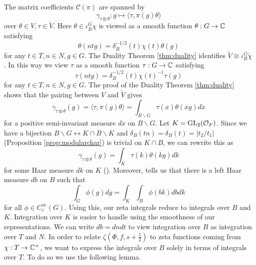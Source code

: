 The matrix coefficients $\mathcal C(\pi)$ are spanned by 
$$\gamma_{\tau \otimes \theta} : g \mapsto \langle \tau, \pi(g) \theta \rangle$$ over $\theta \in V, \tau \in \check{V}$. Here $\theta \in \iota_B^G \chi$ is viewed as a smooth function $\theta : G \to \mathbb{C}$ satisfying 
$$\theta(ntg) = \delta_B^{-1/2}(t) \chi(t) \theta(g)$$
for any $t \in T, n \in N, g \in G$. The Duality Theorem \ref{thm:duality} identifies $\check{V} \cong \iota_B^G \check{\chi}$. In this way we view $\tau$ as a smooth function $\tau: G \to \mathbb{C}$ satisfying
$$\tau(ntg) = \delta_B^{-1/2}(t)\chi(t)^{-1}\tau(g)$$
for any $t \in T, n \in N, g \in G$. The proof of the Duality Theorem \ref{thm:duality} shows that the pairing between $V$ and $\check{V}$ gives
$$\gamma_{\tau \otimes \theta}(g) = \langle \tau, \pi(g)\theta \rangle = \int_{B\backslash G} \tau(x)\theta(xg) d\dot{x}$$ for a positive semi-invariant measure $d\dot{x}$ on $B \backslash G$. Let $K=\mathrm{GL}_2(\mathcal{O}_F)$. Since we have a bijection $B \backslash G \leftrightarrow K \cap B \backslash K$ and $\delta_B(tn)=\delta_B(t) = |t_2/t_1|$ (Proposition \ref{prop:modularchar}) is trivial on $K\cap B$, we can rewrite this as 
$$\gamma_{\tau \otimes \theta}(g) = \int_K \tau(k)\theta(kg)dk$$ for some Haar measure $dk$ on $K$ (\cite[Corollary 7.6]{BH1}). Moreover, \cite[Equation 7.6.2]{BH1} tells us that there is a left Haar measure $db$ on $B$ such that
$$\int_G \phi(g) dg = \int_K \int_B \phi(bk) dbdk$$ for all $\phi \in C_c^\infty(G)$. Using this, our zeta integrals reduce to integrals over $B$ and $K$. Integration over $K$ is easier to handle using the smoothness of our representations. We can write $db = dn dt$ to view integration over $B$ as integration over $T$ and $N$. In order to relate $\zeta(\Phi,f,s+\frac{1}{2})$ to zeta functions coming from $\chi: T \to \mathbb{C}^\times$, we want to express the integrals over $B$ solely in terms of integrals over $T$. To do so we use the following lemma. 

